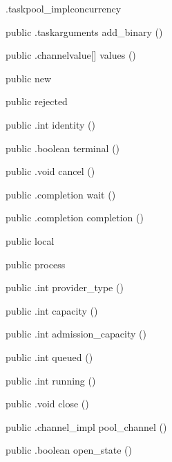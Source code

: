\begin{CrexxClass}{.taskpool\_impl}{concurrency}
\begin{Members}
    \Method
      {public}
      {.taskarguments}
      {add\_binary}
      {()}

    \Method
      {public}
      {.channelvalue[]}
      {values}
      {()}

    \Factory
      {public}
      {new}
      {}

    \Factory
      {public}
      {rejected}
      {}

    \Method
      {public}
      {.int}
      {identity}
      {()}

    \Method
      {public}
      {.boolean}
      {terminal}
      {()}

    \Method
      {public}
      {.void}
      {cancel}
      {()}

    \Method
      {public}
      {.completion}
      {wait}
      {()}

    \Method
      {public}
      {.completion}
      {completion}
      {()}

    \Factory
      {public}
      {local}
      {}

    \Factory
      {public}
      {process}
      {}

    \Method
      {public}
      {.int}
      {provider\_type}
      {()}

    \Method
      {public}
      {.int}
      {capacity}
      {()}

    \Method
      {public}
      {.int}
      {admission\_capacity}
      {()}

    \Method
      {public}
      {.int}
      {queued}
      {()}

    \Method
      {public}
      {.int}
      {running}
      {()}

    \Method
      {public}
      {.void}
      {close}
      {()}

    \Method
      {public}
      {.channel\_impl}
      {pool\_channel}
      {()}

    \Method
      {public}
      {.boolean}
      {open\_state}
      {()}

  \end{Members}
\end{CrexxClass}


